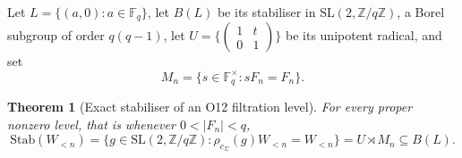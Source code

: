 \documentclass[11pt,a4paper]{article}
\newtheorem{theorem}{Theorem}[section]
\newcommand{\SL}{\mathrm{SL}}
\begin{document}
    Let $L = \{(a,0) : a \in \mathbb{F}_{q}\}$, let $B(L)$ be its stabiliser in
    $\SL(2,\mathbb{Z}/q\mathbb{Z})$, a Borel subgroup of order $q(q-1)$, let
    $U = \{ \left(\begin{smallmatrix} 1 & t \\ 0 & 1 \end{smallmatrix}\right) \}$ be its
    unipotent radical, and set
    \[
      M_{n} = \{ s \in \mathbb{F}_{q}^{\times} : s F_{n} = F_{n} \}.
    \]

    \begin{theorem}[Exact stabiliser of an O12 filtration level]
      \label{thm:o12-stabiliser}
      For every proper nonzero level, that is whenever $0 < |F_{n}| < q$,
      \[
        \mathrm{Stab}(W_{<n})
        = \{ g \in \SL(2,\mathbb{Z}/q\mathbb{Z}) : \rho_{c_{\Sigma}}(g) W_{<n} = W_{<n} \}
        = U \rtimes M_{n}
        \subseteq B(L).
      \]
    \end{theorem}
\end{document}
